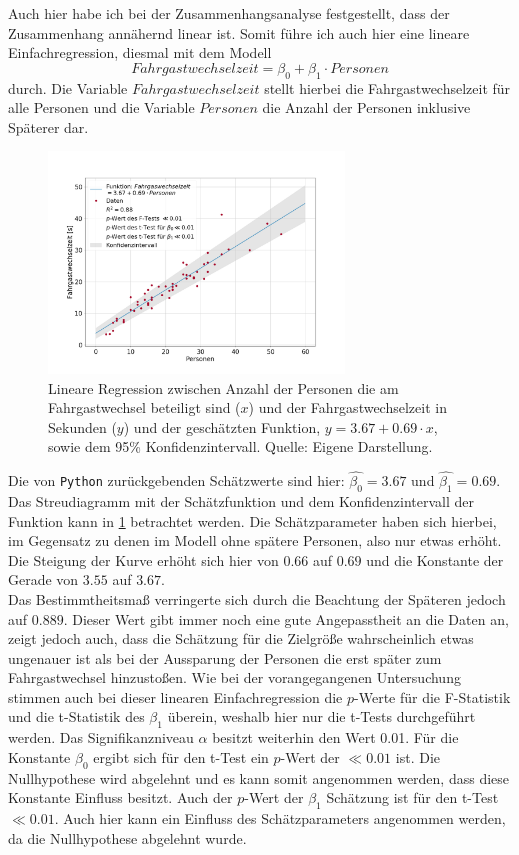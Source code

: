 Auch hier habe ich bei der Zusammenhangsanalyse festgestellt, dass der Zusammenhang annähernd linear ist. Somit führe ich auch hier eine lineare Einfachregression, diesmal mit dem Modell
\begin{equation}
Fahrgastwechselzeit = \beta_0 + \beta_1 \cdot Personen
\end{equation}
durch. Die Variable $Fahrgastwechselzeit$ stellt hierbei die Fahrgastwechselzeit für alle Personen und die Variable $Personen$ die Anzahl der Personen inklusive Späterer dar.
\begin{figure}[H]
	\centering
		\includegraphics[width=0.7\textwidth]{pictures/data_evaluation/transferTime/lin_transfer_time.png}
	\caption{Lineare Regression zwischen Anzahl der Personen die am Fahrgastwechsel beteiligt sind ($x$) und der Fahrgastwechselzeit in Sekunden ($y$) und der geschätzten Funktion, $y= 3.67 + 0.69 \cdot x$, sowie dem 95\% Konfidenzintervall. Quelle: Eigene Darstellung.}
	\label{fig:LinRegAlle}
\end{figure}
Die von \texttt{Python} zurückgebenden Schätzwerte sind hier: $\hat{\beta_0}=3.67$ und $\hat{\beta_1}=0.69$. Das Streudiagramm mit der Schätzfunktion und dem Konfidenzintervall der Funktion kann in \figurename \ref{fig:LinRegAlle} betrachtet werden.
Die Schätzparameter haben sich hierbei, im Gegensatz zu denen im Modell ohne spätere Personen, also nur etwas erhöht. Die Steigung der Kurve erhöht sich hier von $0.66$ auf $0.69$ und die Konstante der Gerade von $3.55$ auf $3.67$. \\
Das Bestimmtheitsmaß verringerte sich durch die Beachtung der Späteren jedoch auf $0.889$. Dieser Wert gibt immer noch eine gute Angepasstheit an die Daten an, zeigt jedoch auch, dass die Schätzung für die Zielgröße wahrscheinlich etwas ungenauer ist als bei der Aussparung der Personen die erst später zum Fahrgastwechsel hinzustoßen. Wie bei der vorangegangenen Untersuchung stimmen auch bei dieser linearen Einfachregression die $p$-Werte für die F-Statistik und die t-Statistik des $\beta_1$ überein, weshalb hier nur die t-Tests durchgeführt werden. Das Signifikanzniveau $\alpha$ besitzt weiterhin den Wert 0.01. Für die Konstante $\beta_0$ ergibt sich für den t-Test ein $p$-Wert der $\ll 0.01$ ist. Die Nullhypothese wird abgelehnt und es kann somit angenommen werden, dass diese Konstante Einfluss besitzt. Auch der $p$-Wert der $\beta_1$ Schätzung ist für den t-Test $\ll 0.01$. Auch hier kann ein Einfluss des Schätzparameters angenommen werden, da die Nullhypothese abgelehnt wurde.

